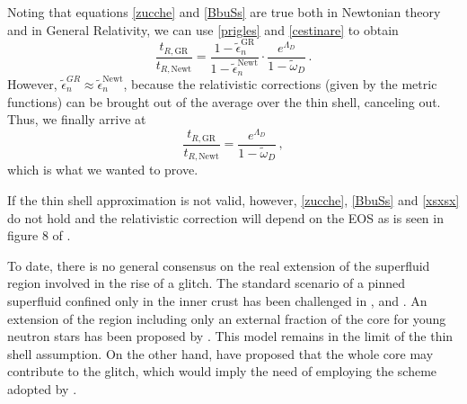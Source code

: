 \documentclass[usenatbib%
]{mnras}
\begin{document}
Noting that equations \eqref{zucche} and \eqref{BbuSs} are true both in Newtonian theory and in General Relativity, we can use \eqref{prigles} and \eqref{cestinare} to obtain
\begin{equation}
\dfrac{t_{R,\textrm{GR}}}{t_{R,\textrm{Newt}}} =  \dfrac{1-\tilde{\epsilon}_n^{\textrm{GR}}}{1-\tilde{\epsilon}_n^{\textrm{Newt}}} \cdot \dfrac{e^{\Lambda_D}}{1-\tilde{\omega}_D} \, .
\end{equation}
However,  $\tilde{\epsilon}_n^{GR} \approx \tilde{\epsilon}_n^{\textrm{Newt}}$, because the relativistic corrections (given by the metric functions) can be brought out of the average over the thin shell, canceling out. 
Thus, we finally arrive at
\begin{equation}\label{xsxsx}
\dfrac{t_{R,\textrm{GR}}}{t_{R,\textrm{Newt}}} =   \dfrac{e^{\Lambda_D}}{1-\tilde{\omega}_D} \, ,
\end{equation}
which is what we wanted to prove.

If the thin shell approximation is not valid, however, \eqref{zucche}, \eqref{BbuSs} and \eqref{xsxsx} do not hold and the relativistic correction will depend on the EOS as is seen in figure 8 of \cite{sourie_glitch2017}.

To date, there is no general consensus on the real extension of the superfluid region involved in the rise of a glitch. The standard scenario of a pinned superfluid confined only in the inner crust has been challenged in \cite{andersson+2012}, \cite{chamel2013} and \cite{pizzochero2019core}. An extension of the region including only an external fraction of the core for young neutron stars has been proposed by \cite{Ho_2015}. This model remains in the limit of the thin shell assumption. On the other hand, \cite{Alpar2014} have proposed that the whole core may contribute to the glitch, which would imply the need of employing the scheme adopted by \cite{sourie_glitch2017}.
\end{document}
